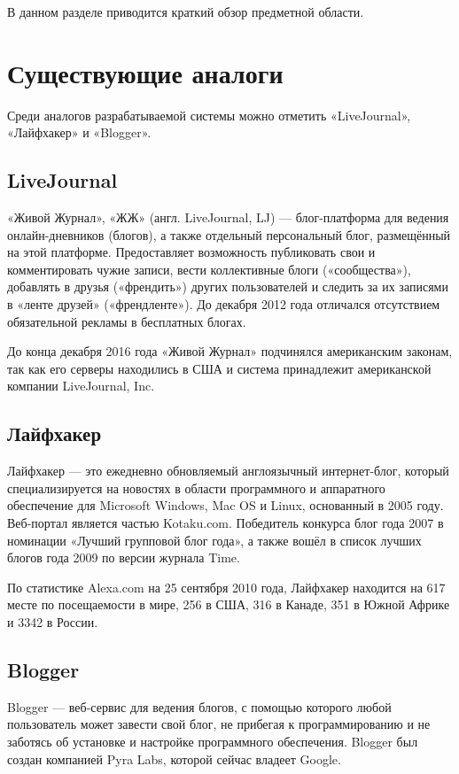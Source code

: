 В данном разделе приводится краткий обзор предметной области.

\section{Существующие аналоги}

Среди аналогов разрабатываемой системы можно отметить «LiveJournal», «Лайфхакер» и «Blogger».

\subsection{LiveJournal}

«Живой Журнал», «ЖЖ» (англ. LiveJournal, LJ) \cite{LJ} — блог-платформа для ведения онлайн-дневников (блогов), а также отдельный персональный блог, размещённый на этой платформе.
Предоставляет возможность публиковать свои и комментировать чужие записи, вести коллективные блоги («сообщества»), добавлять в друзья («френдить») других пользователей и следить за их записями в «ленте друзей» («френдленте»).
До декабря 2012 года отличался отсутствием обязательной рекламы в бесплатных блогах.

До конца декабря 2016 года «Живой Журнал» подчинялся американским законам, так как его серверы находились в США и система принадлежит американской компании LiveJournal, Inc.

\subsection{Лайфхакер}

Лайфхакер \cite{lifehacker} — это ежедневно обновляемый англоязычный интернет-блог, который специализируется на новостях в области программного и аппаратного обеспечение для Microsoft Windows, Mac OS и Linux, основанный в 2005 году.
Веб-портал является частью Kotaku.com. Победитель конкурса блог года 2007 в номинации «Лучший групповой блог года», а также вошёл в список лучших блогов года 2009 по версии журнала Time.

По статистике Alexa.com на 25 сентября 2010 года, Лайфхакер находится на 617 месте по посещаемости в мире, 256 в США, 316 в Канаде, 351 в Южной Африке и 3342 в России.

\subsection{Blogger}

Blogger \cite{blogger} — веб-сервис для ведения блогов, с помощью которого любой пользователь может завести свой блог, не прибегая к программированию и не заботясь об установке и настройке программного обеспечения. Blogger был создан компанией Pyra Labs, которой сейчас владеет Google.

